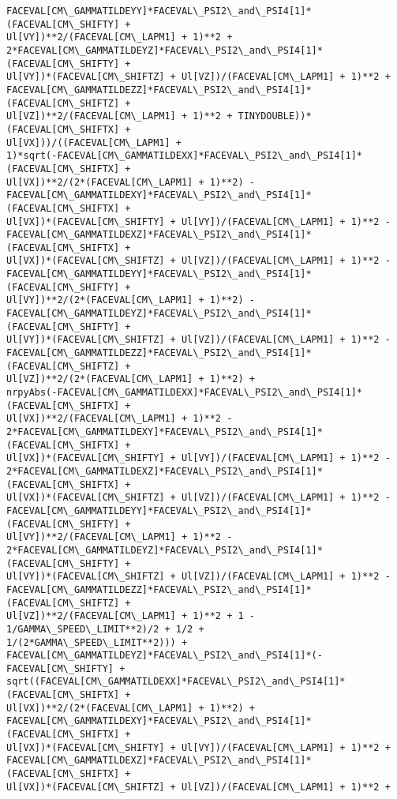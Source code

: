 \documentclass[landscape,letterpaper,10pt,english]{article}
\begin{document}
\begin{Verbatim}[commandchars=\\\{\}]
FACEVAL[CM\_GAMMATILDEYY]*FACEVAL\_PSI2\_and\_PSI4[1]*(FACEVAL[CM\_SHIFTY] +
Ul[VY])**2/(FACEVAL[CM\_LAPM1] + 1)**2 +
2*FACEVAL[CM\_GAMMATILDEYZ]*FACEVAL\_PSI2\_and\_PSI4[1]*(FACEVAL[CM\_SHIFTY] +
Ul[VY])*(FACEVAL[CM\_SHIFTZ] + Ul[VZ])/(FACEVAL[CM\_LAPM1] + 1)**2 +
FACEVAL[CM\_GAMMATILDEZZ]*FACEVAL\_PSI2\_and\_PSI4[1]*(FACEVAL[CM\_SHIFTZ] +
Ul[VZ])**2/(FACEVAL[CM\_LAPM1] + 1)**2 + TINYDOUBLE))*(FACEVAL[CM\_SHIFTX] +
Ul[VX]))/((FACEVAL[CM\_LAPM1] +
1)*sqrt(-FACEVAL[CM\_GAMMATILDEXX]*FACEVAL\_PSI2\_and\_PSI4[1]*(FACEVAL[CM\_SHIFTX] +
Ul[VX])**2/(2*(FACEVAL[CM\_LAPM1] + 1)**2) -
FACEVAL[CM\_GAMMATILDEXY]*FACEVAL\_PSI2\_and\_PSI4[1]*(FACEVAL[CM\_SHIFTX] +
Ul[VX])*(FACEVAL[CM\_SHIFTY] + Ul[VY])/(FACEVAL[CM\_LAPM1] + 1)**2 -
FACEVAL[CM\_GAMMATILDEXZ]*FACEVAL\_PSI2\_and\_PSI4[1]*(FACEVAL[CM\_SHIFTX] +
Ul[VX])*(FACEVAL[CM\_SHIFTZ] + Ul[VZ])/(FACEVAL[CM\_LAPM1] + 1)**2 -
FACEVAL[CM\_GAMMATILDEYY]*FACEVAL\_PSI2\_and\_PSI4[1]*(FACEVAL[CM\_SHIFTY] +
Ul[VY])**2/(2*(FACEVAL[CM\_LAPM1] + 1)**2) -
FACEVAL[CM\_GAMMATILDEYZ]*FACEVAL\_PSI2\_and\_PSI4[1]*(FACEVAL[CM\_SHIFTY] +
Ul[VY])*(FACEVAL[CM\_SHIFTZ] + Ul[VZ])/(FACEVAL[CM\_LAPM1] + 1)**2 -
FACEVAL[CM\_GAMMATILDEZZ]*FACEVAL\_PSI2\_and\_PSI4[1]*(FACEVAL[CM\_SHIFTZ] +
Ul[VZ])**2/(2*(FACEVAL[CM\_LAPM1] + 1)**2) +
nrpyAbs(-FACEVAL[CM\_GAMMATILDEXX]*FACEVAL\_PSI2\_and\_PSI4[1]*(FACEVAL[CM\_SHIFTX] +
Ul[VX])**2/(FACEVAL[CM\_LAPM1] + 1)**2 -
2*FACEVAL[CM\_GAMMATILDEXY]*FACEVAL\_PSI2\_and\_PSI4[1]*(FACEVAL[CM\_SHIFTX] +
Ul[VX])*(FACEVAL[CM\_SHIFTY] + Ul[VY])/(FACEVAL[CM\_LAPM1] + 1)**2 -
2*FACEVAL[CM\_GAMMATILDEXZ]*FACEVAL\_PSI2\_and\_PSI4[1]*(FACEVAL[CM\_SHIFTX] +
Ul[VX])*(FACEVAL[CM\_SHIFTZ] + Ul[VZ])/(FACEVAL[CM\_LAPM1] + 1)**2 -
FACEVAL[CM\_GAMMATILDEYY]*FACEVAL\_PSI2\_and\_PSI4[1]*(FACEVAL[CM\_SHIFTY] +
Ul[VY])**2/(FACEVAL[CM\_LAPM1] + 1)**2 -
2*FACEVAL[CM\_GAMMATILDEYZ]*FACEVAL\_PSI2\_and\_PSI4[1]*(FACEVAL[CM\_SHIFTY] +
Ul[VY])*(FACEVAL[CM\_SHIFTZ] + Ul[VZ])/(FACEVAL[CM\_LAPM1] + 1)**2 -
FACEVAL[CM\_GAMMATILDEZZ]*FACEVAL\_PSI2\_and\_PSI4[1]*(FACEVAL[CM\_SHIFTZ] +
Ul[VZ])**2/(FACEVAL[CM\_LAPM1] + 1)**2 + 1 - 1/GAMMA\_SPEED\_LIMIT**2)/2 + 1/2 +
1/(2*GAMMA\_SPEED\_LIMIT**2))) +
FACEVAL[CM\_GAMMATILDEYZ]*FACEVAL\_PSI2\_and\_PSI4[1]*(-FACEVAL[CM\_SHIFTY] +
sqrt((FACEVAL[CM\_GAMMATILDEXX]*FACEVAL\_PSI2\_and\_PSI4[1]*(FACEVAL[CM\_SHIFTX] +
Ul[VX])**2/(2*(FACEVAL[CM\_LAPM1] + 1)**2) +
FACEVAL[CM\_GAMMATILDEXY]*FACEVAL\_PSI2\_and\_PSI4[1]*(FACEVAL[CM\_SHIFTX] +
Ul[VX])*(FACEVAL[CM\_SHIFTY] + Ul[VY])/(FACEVAL[CM\_LAPM1] + 1)**2 +
FACEVAL[CM\_GAMMATILDEXZ]*FACEVAL\_PSI2\_and\_PSI4[1]*(FACEVAL[CM\_SHIFTX] +
Ul[VX])*(FACEVAL[CM\_SHIFTZ] + Ul[VZ])/(FACEVAL[CM\_LAPM1] + 1)**2 +

\end{Verbatim}
\end{document}
